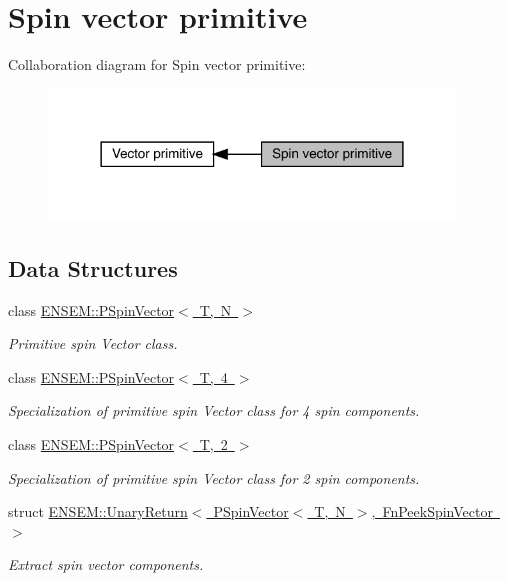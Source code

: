 \hypertarget{group__primspinvector}{}\section{Spin vector primitive}
\label{group__primspinvector}
Collaboration diagram for Spin vector primitive\+:\nopagebreak
\begin{figure}[H]
\begin{center}
\leavevmode
\includegraphics[width=306pt]{dd/d6d/group__primspinvector}
\end{center}
\end{figure}
\subsection*{Data Structures}
\begin{DoxyCompactItemize}
\item 
class \mbox{\hyperlink{classENSEM_1_1PSpinVector}{E\+N\+S\+E\+M\+::\+P\+Spin\+Vector$<$ T, N $>$}}
\begin{DoxyCompactList}\small\item\em Primitive spin Vector class. \end{DoxyCompactList}\item 
class \mbox{\hyperlink{classENSEM_1_1PSpinVector_3_01T_00_014_01_4}{E\+N\+S\+E\+M\+::\+P\+Spin\+Vector$<$ T, 4 $>$}}
\begin{DoxyCompactList}\small\item\em Specialization of primitive spin Vector class for 4 spin components. \end{DoxyCompactList}\item 
class \mbox{\hyperlink{classENSEM_1_1PSpinVector_3_01T_00_012_01_4}{E\+N\+S\+E\+M\+::\+P\+Spin\+Vector$<$ T, 2 $>$}}
\begin{DoxyCompactList}\small\item\em Specialization of primitive spin Vector class for 2 spin components. \end{DoxyCompactList}\item 
struct \mbox{\hyperlink{structENSEM_1_1UnaryReturn_3_01PSpinVector_3_01T_00_01N_01_4_00_01FnPeekSpinVector_01_4}{E\+N\+S\+E\+M\+::\+Unary\+Return$<$ P\+Spin\+Vector$<$ T, N $>$, Fn\+Peek\+Spin\+Vector $>$}}
\begin{DoxyCompactList}\small\item\em Extract spin vector components. \end{DoxyCompactList}\end{DoxyCompactItemize}
